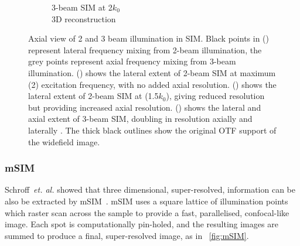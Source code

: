 \begin{figure}
\begin{subfigure}[t]{0.48\textwidth}
        \caption{3-beam SIM at \SI{2}{\times}$k_0$\\3D reconstruction}
        \label{fig:sim_axial_3_beam}
    \end{subfigure}\hfill
    \caption{
    Axial view of 2 and 3 beam illumination in \gls{SIM}.
    Black points in () represent lateral frequency mixing from 2-beam illumination, the grey points represent axial frequency mixing from 3-beam illumination.
    () shows the lateral extent of 2-beam \gls{SIM} at maximum (\SI{2}{\times}) excitation frequency, with no added axial resolution.
    () shows the lateral extent of 2-beam \gls{SIM} at (\SI{1.5}{\times}$k_0$), giving reduced resolution but providing increased axial resolution.
     () shows the lateral and axial extent of 3-beam \gls{SIM}, doubling in resolution axially and laterally \cite{gustasson}.
     The thick black outlines show the original OTF support of the widefield image.    %
    }
    \label{fig:sim_axial}
\end{figure}

\subsubsection{\gls{mSIM}}\label{sec:msim}

Schroff~\emph{et. al.} showed that three dimensional, super-resolved, information can be also be extracted by \gls{mSIM}~\cite{yorkResolutionDoublingLive2012}.
\gls{mSIM} uses a square lattice of illumination points which raster scan across the sample to provide a fast, parallelised, confocal-like image.
Each spot is computationally pin-holed, and the resulting images are summed to produce a final, super-resolved image, as in \figurename~\ref{fig:mSIM}.


